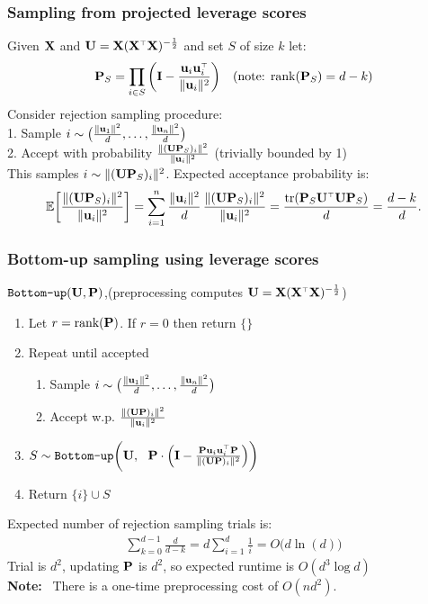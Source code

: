 \documentclass{beamer}
\begin{document}
\begin{frame}
  \frametitle{Sampling from projected leverage scores}
Given $\X$ and $\U=\X(\X^\top\X)^{-\frac12}$ and set $S$ of size $k$
let:
\begin{align*}
  \P_S = \prod_{i\in S}\bigg(\I -
  \frac{\u_i\u_i^\top}{\|\u_i\|^2}\bigg)\quad (\text{note:
  }\text{rank}(\P_S) = d-k)
\end{align*}
Consider rejection sampling procedure:\\[1mm]
1. Sample $i\sim
\big(\frac{\|\u_1\|^2}{d},\dots,\frac{\|\u_n\|^2}{d}\big)$\\
2. Accept with probability $\frac{\|(\U\P_S)_i\|^2}{\|\u_i\|^2}$
(trivially bounded by 1)\\[5mm]
This samples $i\sim \|(\U\P_S)_i\|^2$. Expected acceptance probability is:
\begin{align*}
  \E\bigg[\frac{\|(\U\P_S)_i\|^2}{\|\u_i\|^2}\bigg]
  = \sum_{i=1}^n\frac{\|\u_i\|^2}{d}\,
  \frac{\|(\U\P_S)_i\|^2}{\|\u_i\|^2} = \frac{\tr(\P_S\U^\top\U\P_S)}{d} = \frac{d-k}{d}.
\end{align*}
\end{frame}

\begin{frame}
  \frametitle{Bottom-up sampling using leverage scores}
  $\verb~Bottom-up~(\U,\P)$,\quad \big(preprocessing computes
  $\U=\X(\X^\top\X)^{-\frac12}$\big)
  \begin{enumerate}
  \item Let $r=\text{rank}(\P)$. If $r = 0$ then return $\{\}$
  \item Repeat until accepted
    \begin{enumerate}
      \item Sample $i \sim
        \big(\frac{\|\u_1\|^2}{d},\dots,\frac{\|\u_n\|^2}{d}\big)$
      \item Accept w.p. $\frac{\|(\U\P)_i\|^2}{\|\u_i\|^2}$
      \end{enumerate}
    \item $S \sim \verb~Bottom-up~\bigg(\U,\ \  \P\cdot \Big(\I -
      \frac{\P\u_i\u_i^\top\P}{\|(\U\P)_i\|^2}\Big)\bigg)$
    \item Return $\{i\} \cup S$
    \end{enumerate}
    Expected number of rejection sampling trials is:
    \begin{align*}
      \sum_{k=0}^{d-1}\frac{d}{d-k} = d\sum_{i=1}^d\frac1i= O\big(d\ln(d)\big)
    \end{align*}
Trial is $d^2$, updating $\P$ is $d^2$, so expected
runtime is $O(d^3\log d)$\\
\textbf{Note:} \ There is a one-time preprocessing cost of $O(nd^2)$.
\end{frame}
\end{document}
